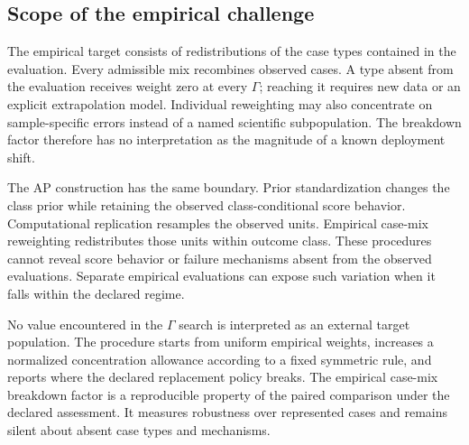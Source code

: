 \documentclass[11pt]{article}
\theoremstyle{remark}
\begin{document}
\subsection{Scope of the empirical challenge}

The empirical target consists of redistributions of the case types contained
in the evaluation. Every admissible mix recombines observed cases. A type absent
from the evaluation receives weight zero at every $\Gamma$; reaching it requires
new data or an explicit extrapolation model. Individual reweighting may also
concentrate on sample-specific errors instead of a named scientific
subpopulation. The breakdown factor therefore has no interpretation as the
magnitude of a known deployment shift.

The AP construction has the same boundary. Prior standardization changes the
class prior while retaining the observed class-conditional score behavior.
Computational replication resamples the observed units. Empirical case-mix
reweighting redistributes those units within outcome class. These procedures
cannot reveal score behavior or failure mechanisms absent from the observed
evaluations. Separate empirical evaluations can expose such variation when it
falls within the declared regime.

No value encountered in the $\Gamma$ search is interpreted as an external
target population. The procedure starts from uniform empirical weights,
increases a normalized concentration allowance according to a fixed symmetric
rule, and reports where the declared replacement policy breaks. The empirical
case-mix breakdown factor is a reproducible property of the paired comparison
under the declared assessment. It measures robustness over represented cases
and remains silent about absent case types and mechanisms.
\end{document}
